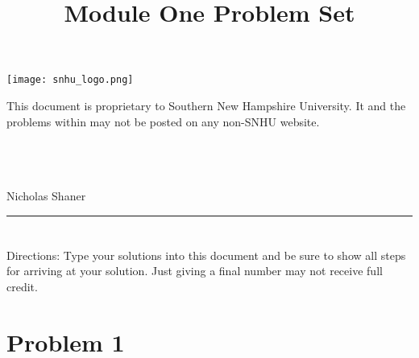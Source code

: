 \documentclass{amsart}
\theoremstyle{definition}
\theoremstyle{Exercise}
\theoremstyle{remark}
\theoremstyle{rule}
\numberwithin{equation}{section}
\begin{document}
\title{\sf Module One Problem Set}%





\begin{center}
\texttt{[image: snhu\_logo.png]}
\end{center}

\maketitle 
This document is proprietary to Southern New Hampshire University. It and the problems within may not be posted on any non-SNHU website.
\\\\\\\\
\begin{center}
Nicholas Shaner
\end{center}

\begin{center}
\rule{\textwidth}{0.4pt}
\end{center}
\newpage


\section*{}


\section*{}
Directions: Type your solutions into this document and be sure to show all steps for arriving at your solution. Just giving a final number may not receive full credit.
\\

\section*{Problem 1}
\end{document}
